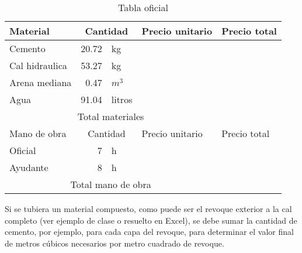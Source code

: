 \documentclass[../main.tex]{subfiles}
\begin{document}
\begin{table}[ht]
  \centering
  \caption{Tabla oficial}
    \begin{tabular}{|c|c|c|c|r|}
    \hline
    \multicolumn{1}{|l}{Material} & \multicolumn{2}{c}{Cantidad} & \multicolumn{1}{l}{Precio unitario} & \multicolumn{1}{l|}{Precio total} \bigstrut\\
    \hline
    \multicolumn{1}{|l|}{Cemento} & \multicolumn{1}{r}{20.72} & \multicolumn{1}{l|}{kg} &       &  \bigstrut\\
\cline{1-1}\cline{4-5}    \multicolumn{1}{|l|}{Cal hidraulica} & \multicolumn{1}{r}{53.27} & \multicolumn{1}{l|}{kg} &       &  \bigstrut\\
\cline{1-1}\cline{4-5}    \multicolumn{1}{|l|}{Arena mediana} & \multicolumn{1}{r}{0.47} & \multicolumn{1}{l|}{$m^3$} &       &  \bigstrut\\
\cline{1-1}\cline{4-5}    \multicolumn{1}{|l|}{Agua} & \multicolumn{1}{r}{91.04} & \multicolumn{1}{l|}{litros} &       &  \bigstrut\\
    \hline
    \multicolumn{4}{|c|}{Total materiales} &  \bigstrut\\
    \hline
    \multicolumn{1}{|l|}{Mano de obra} & \multicolumn{2}{c|}{Cantidad} & \multicolumn{1}{l|}{Precio unitario} & \multicolumn{1}{l|}{Precio total} \bigstrut\\
    \hline
    \multicolumn{1}{|l|}{Oficial} & \multicolumn{1}{r}{7} & \multicolumn{1}{l|}{h} &       &  \bigstrut\\
\cline{1-1}\cline{4-5}    \multicolumn{1}{|l|}{Ayudante} & \multicolumn{1}{r}{8} & \multicolumn{1}{l|}{h} &       &  \bigstrut\\
    \hline
    \multicolumn{4}{|c|}{Total mano de obra} &  \bigstrut\\
    \hline
    \end{tabular}%
  \label{tab:tablafinal}%
\end{table}%


Si se tubiera un material compuesto, como puede ser el revoque exterior a la cal
completo (ver ejemplo de clase o resuelto en Excel), se debe sumar la cantidad
de cemento, por ejemplo, para cada capa del revoque, para determinar el valor
final de metros cúbicos necesarios por metro cuadrado de revoque.
\end{document}
